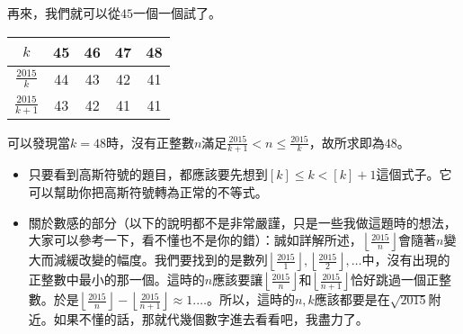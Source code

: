 \documentclass[math]{answer}
\begin{document}
\begin{questions}
{		再來，我們就可以從$45$一個一個試了。
		\begin{table}[H]
			\centering
			\begin{tabular}{ccccc}
				\toprule
				$k$                  & 45 & 46 & 47 & 48 \\
				\midrule
				$\frac{2015}{k}$     & 44 & 43 & 42 & 41 \\
				$\frac{2015}{k + 1}$ & 43 & 42 & 41 & 41 \\
				\bottomrule
			\end{tabular}
		\end{table}
		可以發現當$k = 48$時，沒有正整數$n$滿足$\frac{2015}{k + 1} < n \leq \frac{2015}{k}$，故所求即為$48$。
	}{
		\begin{itemize}
			\item 只要看到高斯符號的題目，都應該要先想到$[k] \leq k < [k] + 1$這個式子。它可以幫助你把高斯符號轉為正常的不等式。
			\item 關於數感的部分（以下的說明都不是非常嚴謹，只是一些我做這題時的想法，大家可以參考一下，看不懂也不是你的錯）：誠如詳解所述，$\left\lfloor \frac{2015}{n} \right\rfloor$會隨著$n$變大而減緩改變的幅度。我們要找到的是數列$\left\lfloor \frac{2015}{1} \right\rfloor, \left\lfloor \frac{2015}{2} \right\rfloor,\dots$中，沒有出現的正整數中最小的那一個。這時的$n$應該要讓$\left\lfloor \frac{2015}{n} \right\rfloor$和$\left\lfloor \frac{2015}{n+1} \right\rfloor$恰好跳過一個正整數。於是$\left\lfloor \frac{2015}{n} \right\rfloor - \left\lfloor \frac{2015}{n + 1} \right\rfloor\approx 1.\dots$。所以，這時的$n, k$應該都要是在$\sqrt{2015}$附近。如果不懂的話，那就代幾個數字進去看看吧，我盡力了。
		\end{itemize}
	}

	\question


\end{questions}
\end{document}
